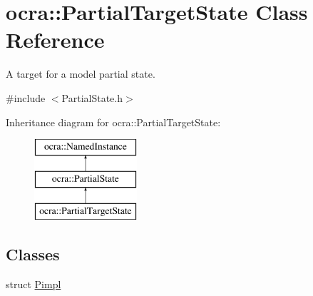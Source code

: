 \hypertarget{classocra_1_1PartialTargetState}{}\section{ocra\+:\+:Partial\+Target\+State Class Reference}
\label{classocra_1_1PartialTargetState}


A target for a model partial state.  




{\ttfamily \#include $<$Partial\+State.\+h$>$}

Inheritance diagram for ocra\+:\+:Partial\+Target\+State\+:\begin{figure}[H]
\begin{center}
\leavevmode
\includegraphics[height=3.000000cm]{d1/def/classocra_1_1PartialTargetState}
\end{center}
\end{figure}
\subsection*{Classes}
\begin{DoxyCompactItemize}
\item 
struct \hyperlink{structocra_1_1PartialTargetState_1_1Pimpl}{Pimpl}
\end{DoxyCompactItemize}
